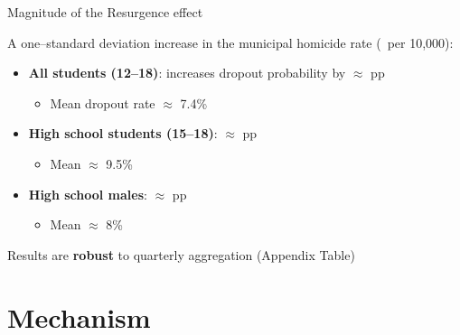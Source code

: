 \documentclass[aspectratio=169]{beamer}
\begin{document}
\begin{frame}{Magnitude of the Resurgence effect}

A one--standard deviation increase in the municipal homicide rate (\MunicipalHRSD\ per 10,000):

\vspace{0.4cm}

\begin{itemize}
    \item \textbf{All students (12--18)}: increases dropout probability by $\approx$ {} pp
    \begin{itemize}
        \item Mean dropout rate $\approx$ 7.4\%
    \end{itemize}

    \vspace{0.3cm}

    \item \textbf{High school students (15--18)}: $\approx$ {} pp
    \begin{itemize}
        \item Mean $\approx$ 9.5\%
    \end{itemize}

    \vspace{0.3cm}

    \item \textbf{High school males}: $\approx$ {} pp
    \begin{itemize}
        \item Mean $\approx$ 8\%
    \end{itemize}
\end{itemize}

\vspace{0.4cm}
\pause

Results are \textbf{robust} to quarterly aggregation (Appendix Table)

\end{frame}


\section{Mechanism}
\end{document}
